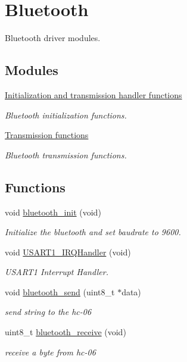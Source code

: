 \hypertarget{group___bluetooth}{}\section{Bluetooth}
\label{group___bluetooth}


Bluetooth driver modules.  


\subsection*{Modules}
\begin{DoxyCompactItemize}
\item 
\hyperlink{group___bluetooth___init}{Initialization and transmission handler functions}
\begin{DoxyCompactList}\small\item\em Bluetooth initialization functions. \end{DoxyCompactList}\item 
\hyperlink{group___bluetooth___trans}{Transmission functions}
\begin{DoxyCompactList}\small\item\em Bluetooth transmission functions. \end{DoxyCompactList}\end{DoxyCompactItemize}
\subsection*{Functions}
\begin{DoxyCompactItemize}
\item 
void \hyperlink{group___bluetooth_gaaa60810e0857e9e1e5b2cba80b8db3ff}{bluetooth\+\_\+init} (void)
\begin{DoxyCompactList}\small\item\em Initialize the bluetooth and set baudrate to 9600. \end{DoxyCompactList}\item 
void \hyperlink{group___bluetooth_ga7139cd4baabbbcbab0c1fe6d7d4ae1cc}{U\+S\+A\+R\+T1\+\_\+\+I\+R\+Q\+Handler} (void)
\begin{DoxyCompactList}\small\item\em U\+S\+A\+R\+T1 Interrupt Handler. \end{DoxyCompactList}\item 
void \hyperlink{group___bluetooth_ga31d829d5658369ee2c90b9c3cdbedfe1}{bluetooth\+\_\+send} (uint8\+\_\+t $\ast$data)
\begin{DoxyCompactList}\small\item\em send string to the hc-\/06 \end{DoxyCompactList}\item 
uint8\+\_\+t \hyperlink{group___bluetooth_gab7ad1e1b94cf1cedc8a8e5151b0e25cb}{bluetooth\+\_\+receive} (void)
\begin{DoxyCompactList}\small\item\em receive a byte from hc-\/06 \end{DoxyCompactList}\end{DoxyCompactItemize}



